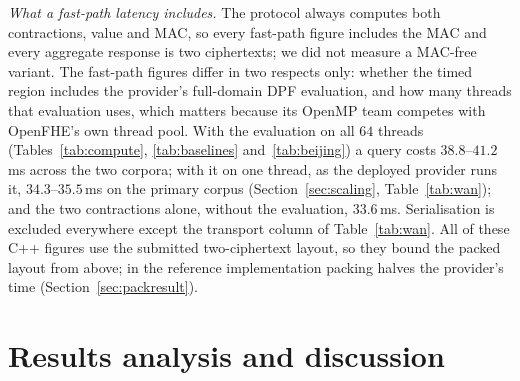 \documentclass[a4paper,fleqn]{cas-dc}
\newif\ifauthorchecks
\newcommand{\authorcheck}[1]{\ifauthorchecks{\color{red}\textsf{[Authors: #1]}}\fi}
\begin{document}
\emph{What a fast-path latency includes.} The protocol always computes both
contractions, value and MAC, so every fast-path figure includes the MAC and
every aggregate response is two ciphertexts; we did not measure a MAC-free
variant. The fast-path figures differ in two respects only: whether the timed
region includes the provider's full-domain DPF evaluation, and how many
threads that evaluation uses, which matters because its OpenMP team competes
with OpenFHE's own thread pool. With the evaluation on all $64$ threads
(Tables~\ref{tab:compute}, \ref{tab:baselines} and~\ref{tab:beijing}) a query
costs $38.8$--$41.2$\,ms across the two corpora; with it on one thread, as the
deployed provider runs it, $34.3$--$35.5$\,ms on the primary corpus
(Section~\ref{sec:scaling}, Table~\ref{tab:wan}); and the two contractions
alone, without the evaluation, $33.6$\,ms. Serialisation is excluded
everywhere except the transport column of Table~\ref{tab:wan}. All of these C++
figures use the submitted two-ciphertext layout, so they bound the packed
layout from above; in the reference implementation packing halves the
provider's time (Section~\ref{sec:packresult}).
\authorcheck{Re-measure Tables~\ref{tab:compute}, \ref{tab:baselines},
\ref{tab:wan} and~\ref{tab:beijing} with the packed, compressed layout in C++,
then update the abstract and conclusion.}

\section{Results analysis and discussion}
\label{sec:resultsdisc}
\end{document}
